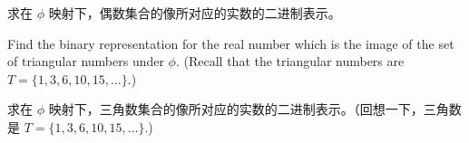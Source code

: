 \begin{exer}
求在 $\phi$ 映射下，偶数集合的像所对应的实数的二进制表示。
\end{exer}

\begin{exer}
Find the binary representation for the real number which is the image of
the set of triangular numbers under $\phi$. (Recall that the triangular
numbers are $T = \{1,3,6,10,15, \ldots \}$.)
\end{exer}

\begin{exer}
求在 $\phi$ 映射下，三角数集合的像所对应的实数的二进制表示。（回想一下，三角数是 $T = \{1,3,6,10,15, \ldots \}$.)
\end{exer}

\newpage





